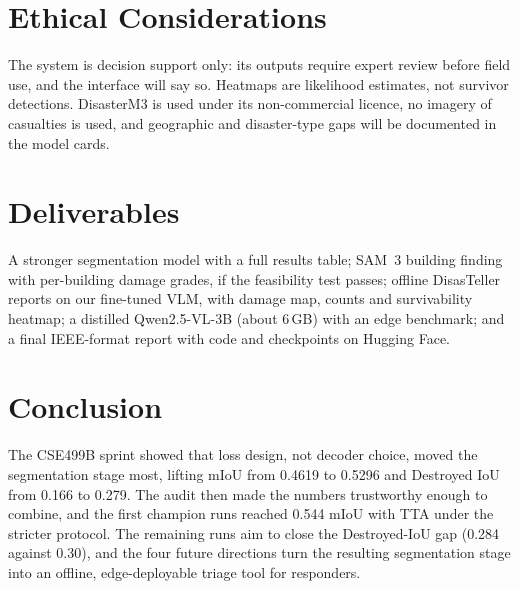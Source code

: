 \documentclass[conference]{IEEEtran}
\begin{document}
\section{Ethical Considerations}
The system is decision support only: its outputs require expert review before field use, and the interface will say so. Heatmaps are likelihood estimates, not survivor detections. DisasterM3 is used under its non-commercial licence, no imagery of casualties is used, and geographic and disaster-type gaps will be documented in the model cards.

\section{Deliverables}
A stronger segmentation model with a full results table; SAM~3 building finding with per-building damage grades, if the feasibility test passes; offline DisasTeller reports on our fine-tuned VLM, with damage map, counts and survivability heatmap; a distilled Qwen2.5-VL-3B (about 6\,GB) with an edge benchmark; and a final IEEE-format report with code and checkpoints on Hugging Face.

\section{Conclusion}
The CSE499B sprint showed that loss design, not decoder choice, moved the segmentation stage most, lifting mIoU from 0.4619 to 0.5296 and Destroyed IoU from 0.166 to 0.279. The audit then made the numbers trustworthy enough to combine, and the first champion runs reached 0.544 mIoU with TTA under the stricter protocol. The remaining runs aim to close the Destroyed-IoU gap (0.284 against 0.30), and the four future directions turn the resulting segmentation stage into an offline, edge-deployable triage tool for responders.
\end{document}
